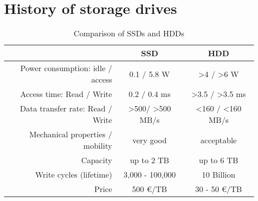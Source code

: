 \documentclass{acm_proc_article-sp}
\begin{document}
\section{History of storage drives}


\begin{table*}[bt]
\centering
\caption{Comparison of SSDs and HDDs}
\begin{tabular}{r|cc}
									& SSD				& HDD				\\ \hline \hline
Power consumption: idle / access		& 0.1 / 5.8 W		& >4 / >6 W			\\ \hline
Access time: Read / Write 			& 0.2 / 0.4 ms		& >3.5 / >3.5 ms	\\ \hline
Data transfer rate: Read / Write		& >500/ >500 MB/s	& <160 / <160 MB/s	\\ \hline
Mechanical properties / mobility		& very good			& acceptable		\\ \hline
Capacity							& up to 2 TB		& up to 6 TB		\\ \hline
Write cycles (lifetime)				& 3,000 - 100,000	& 10 Billion		\\ \hline
Price								& 500 \euro/TB		& 30 - 50 \euro/TB	\\
\end{tabular}
\end{table*}
\end{document}
